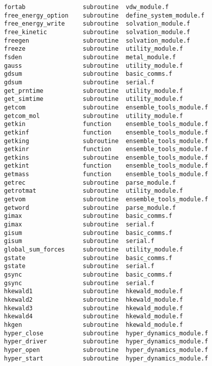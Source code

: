 \begin{verbatim}
fortab                subroutine  vdw_module.f              
free_energy_option    subroutine  define_system_module.f    
free_energy_write     subroutine  solvation_module.f        
free_kinetic          subroutine  solvation_module.f        
freegen               subroutine  solvation_module.f        
freeze                subroutine  utility_module.f          
fsden                 subroutine  metal_module.f            
gauss                 subroutine  utility_module.f          
gdsum                 subroutine  basic_comms.f             
gdsum                 subroutine  serial.f                  
get_prntime           subroutine  utility_module.f          
get_simtime           subroutine  utility_module.f          
getcom                subroutine  ensemble_tools_module.f   
getcom_mol            subroutine  utility_module.f          
getkin                function    ensemble_tools_module.f   
getkinf               function    ensemble_tools_module.f   
getking               subroutine  ensemble_tools_module.f   
getkinr               function    ensemble_tools_module.f   
getkins               subroutine  ensemble_tools_module.f   
getkint               function    ensemble_tools_module.f   
getmass               function    ensemble_tools_module.f   
getrec                subroutine  parse_module.f            
getrotmat             subroutine  utility_module.f          
getvom                subroutine  ensemble_tools_module.f   
getword               subroutine  parse_module.f            
gimax                 subroutine  basic_comms.f             
gimax                 subroutine  serial.f                  
gisum                 subroutine  basic_comms.f             
gisum                 subroutine  serial.f                  
global_sum_forces     subroutine  utility_module.f          
gstate                subroutine  basic_comms.f             
gstate                subroutine  serial.f                  
gsync                 subroutine  basic_comms.f             
gsync                 subroutine  serial.f                  
hkewald1              subroutine  hkewald_module.f          
hkewald2              subroutine  hkewald_module.f          
hkewald3              subroutine  hkewald_module.f          
hkewald4              subroutine  hkewald_module.f          
hkgen                 subroutine  hkewald_module.f          
hyper_close           subroutine  hyper_dynamics_module.f   
hyper_driver          subroutine  hyper_dynamics_module.f   
hyper_open            subroutine  hyper_dynamics_module.f   
hyper_start           subroutine  hyper_dynamics_module.f   

\end{verbatim}
